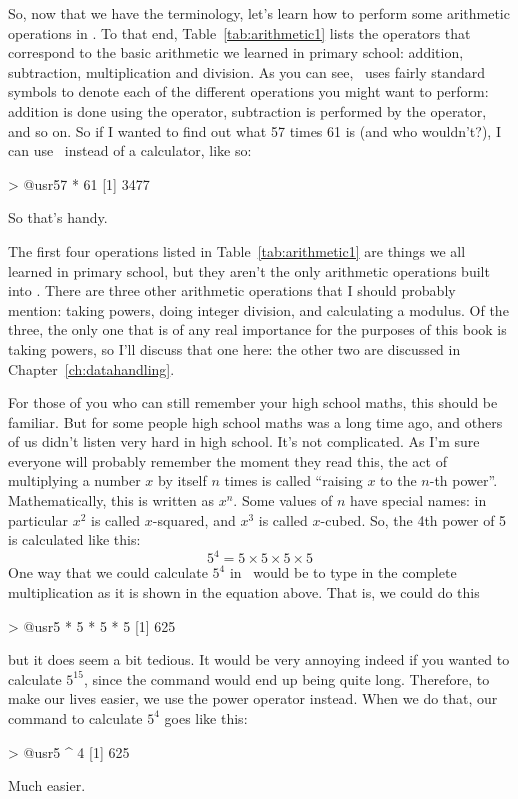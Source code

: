 So, now that we have the terminology, let's learn how to perform some arithmetic operations in \R. To that end, Table~\ref{tab:arithmetic1} lists the operators that correspond to the basic arithmetic we learned in primary school: addition, subtraction, multiplication and division. As you can see, \R\ uses fairly standard symbols to denote each of the different operations you might want to perform: addition is done using the \rtext{+} operator, subtraction is performed by the \rtext{-} operator, and so on. So if I wanted to find out what 57 times 61 is (and who wouldn't?), I can use \R\ instead of a calculator, like so:
\begin{rblock1}
> @usr{57 * 61}
[1] 3477
\end{rblock1}
So that's handy. 




The first four operations listed in Table~\ref{tab:arithmetic1} are things we all learned in primary school, but they aren't the only arithmetic operations built into \R. There are three other arithmetic operations that I should probably mention: taking powers, doing integer division, and calculating a modulus. Of the three, the only one that is of any real importance for the purposes of this book is taking powers, so I'll discuss that one here: the other two are discussed in Chapter~\ref{ch:datahandling}.

For those of you who can still remember your high school maths, this should be familiar. But for some people high school maths was a long time ago, and others of us didn't listen very hard in high school. It's not complicated. As I'm sure everyone will probably remember the moment they read this, the act of multiplying a number $x$ by itself $n$ times is called ``raising $x$ to the $n$-th power''. Mathematically, this is written as $x^n$. Some values of $n$ have special names: in particular $x^2$ is called $x$-squared, and $x^3$ is called $x$-cubed. So, the 4th power of 5 is calculated like this:
$$
5^4 = 5 \times 5 \times 5 \times 5 
$$
One way that we could calculate $5^4$ in \R\ would be to type in the complete multiplication as it is shown in the equation above. That is, we could do this
\begin{rblock1}
> @usr{5 * 5 * 5 * 5}
[1] 625
\end{rblock1}
but it does seem a bit tedious. It would be very annoying indeed if you wanted to calculate $5^{15}$, since the command would end up being quite long. Therefore, to make our lives easier, we use the power operator instead. When we do that, our command to calculate $5^4$ goes like this:
\begin{rblock1}
> @usr{5 ^ 4}
[1] 625
\end{rblock1}
Much easier.


